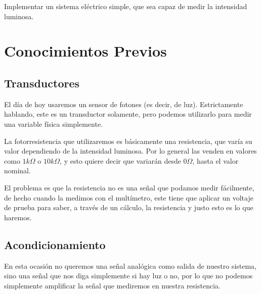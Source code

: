 	Implementar un sistema eléctrico simple, que sea capaz de medir la intensidad luminosa.


\section{Conocimientos Previos}


	\subsection{Transductores}

		El día de hoy usaremos un sensor de fotones (es decir, de luz). Estrictamente hablando, este es un transductor solamente, pero podemos utilizarlo para medir una variable física simplemente.

		La fotorresistencia que utilizaremos es básicamente una resistencia, que varía su valor dependiendo de la intensidad luminosa. Por lo general las venden en valores como $1 k \Omega$ o $10 k \Omega$, y esto quiere decir que variarán desde $0 \Omega$, hasta el valor nominal.

		El problema es que la resistencia no es una señal que podamos medir fácilmente, de hecho cuando la medimos con el multímetro, este tiene que aplicar un voltaje de prueba para saber, a través de un cálculo, la resistencia y justo esto es lo que haremos.


	\subsection{Acondicionamiento}

		En esta ocasión no queremos una señal analógica como salida de nuestro sistema, sino una señal que nos diga simplemente si hay luz o no, por lo que no podemos simplemente amplificar la señal que mediremos en nuestra resistencia.

